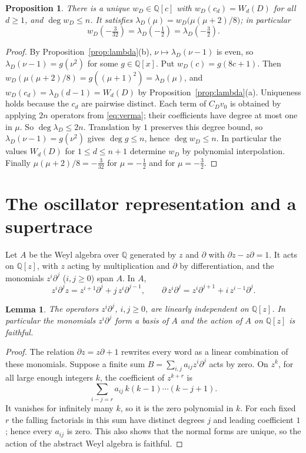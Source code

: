 \documentclass[11pt,a4paper,reqno]{amsart}
\newtheorem{proposition}[theorem]{Proposition}
\newtheorem{lemma}[theorem]{Lemma}
\theoremstyle{definition}
\newcommand{\Q}{\mathbb{Q}}
\newcommand{\dd}{\partial}
\begin{document}
\begin{proposition}\label{prop:wD}
There is a unique $w_D\in\Q[c]$ with $w_D(c_d)=W_d(D)$ for all $d\ge1$, and $\deg w_D\le n$. It satisfies $\lambda_D(\mu)=w_D\bigl(\mu(\mu+2)/8\bigr)$; in particular
\[
w_D(-\tfrac{3}{32})=\lambda_D(-\tfrac12)=\lambda_D(-\tfrac32).
\]
\end{proposition}

\begin{proof}
By Proposition~\ref{prop:lambda}(b), $\nu\mapsto\lambda_D(\nu-1)$ is even, so $\lambda_D(\nu-1)=g(\nu^2)$ for some $g\in\Q[x]$. Put $w_D(c)=g(8c+1)$. Then $w_D(\mu(\mu+2)/8)=g((\mu+1)^2)=\lambda_D(\mu)$, and $w_D(c_d)=\lambda_D(d-1)=W_d(D)$ by Proposition~\ref{prop:lambda}(a). Uniqueness holds because the $c_d$ are pairwise distinct. Each term of $C_Dv_0$ is obtained by applying $2n$ operators from \eqref{eq:verma}; their coefficients have degree at most one in $\mu$. So $\deg\lambda_D\le2n$. Translation by $1$ preserves this degree bound, so $\lambda_D(\nu-1)=g(\nu^2)$ gives $\deg g\le n$, hence $\deg w_D\le n$. In particular the values $W_d(D)$ for $1\le d\le n+1$ determine $w_D$ by polynomial interpolation. Finally $\mu(\mu+2)/8=-\frac{3}{32}$ for $\mu=-\frac12$ and for $\mu=-\frac32$.
\end{proof}

\section{The oscillator representation and a supertrace}\label{sec:osc}

Let $A$ be the Weyl algebra over $\Q$ generated by $z$ and $\dd$ with $\dd z-z\dd=1$. It acts on $\Q[z]$, with $z$ acting by multiplication and $\dd$ by differentiation, and the monomials $z^i\dd^j$ ($i,j\ge0$) span $A$. In $A$,
\begin{equation}\label{eq:weyl}
z^i\dd^j z=z^{i+1}\dd^j+j\,z^i\dd^{j-1},\qquad \dd\, z^i\dd^j=z^i\dd^{j+1}+i\,z^{i-1}\dd^j .
\end{equation}

\begin{lemma}\label{lem:faithful}
The operators $z^i\dd^j$, $i,j\ge0$, are linearly independent on $\Q[z]$. In particular the monomials $z^i\dd^j$ form a basis of $A$ and the action of $A$ on $\Q[z]$ is faithful.
\end{lemma}

\begin{proof}
The relation $\dd z=z\dd+1$ rewrites every word as a linear combination of these monomials. Suppose a finite sum $B=\sum_{i,j}a_{ij}z^i\dd^j$ acts by zero. On $z^k$, for all large enough integers $k$, the coefficient of $z^{k+r}$ is
\[
\sum_{i-j=r}a_{ij}\,k(k-1)\cdots(k-j+1).
\]
It vanishes for infinitely many $k$, so it is the zero polynomial in $k$. For each fixed $r$ the falling factorials in this sum have distinct degrees $j$ and leading coefficient $1$; hence every $a_{ij}$ is zero. This also shows that the normal forms are unique, so the action of the abstract Weyl algebra is faithful.
\end{proof}
\end{document}
